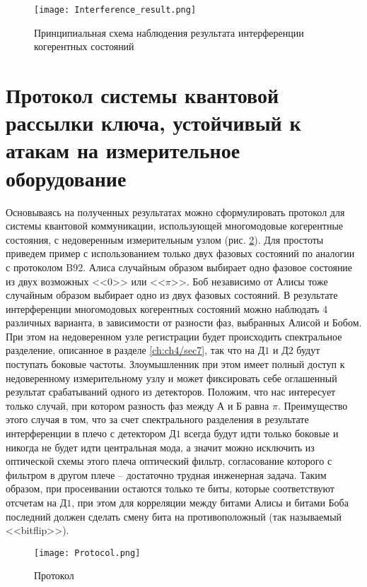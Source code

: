 \begin{figure}[ht]
 \centering
  \texttt{[image: Interference\_result.png]}
  \caption{Принципиальная схема наблюдения результата интерференции когерентных состояний}
  \label{fig:Interference_result}
\end{figure}

\pagebreak

\section{Протокол системы квантовой рассылки ключа, устойчивый к атакам на измерительное оборудование} \label{ch:ch4/sec8}

Основываясь на полученных результатах можно сформулировать протокол для системы квантовой коммуникации, использующей многомодовые когерентные состояния, с недоверенным измерительным узлом (рис. \ref{fig:Protocol}). Для простоты приведем пример с использованием только двух фазовых состояний по аналогии с протоколом B92. Алиса случайным образом выбирает одно фазовое состояние из двух возможных <<$0$>> или <<$\pi$>>. Боб независимо от Алисы тоже случайным образом выбирает одно из двух фазовых состояний. В результате интерференции многомодовых когерентных состояний можно наблюдать 4 различных варианта, в зависимости от разности фаз, выбранных Алисой и Бобом.  При этом на недоверенном узле регистрации будет происходить спектральное разделение, описанное в разделе \ref{ch:ch4/sec7}, так что на $Д1$ и $Д2$ будут поступать боковые частоты. Злоумышленник при этом имеет полный доступ к недоверенному измерительному узлу и может фиксировать себе оглашенный результат срабатываний одного из детекторов. Положим, что нас интересует только случай, при котором разность фаз между $А$ и $Б$ равна $\pi$. Преимущество этого случая в том, что за счет спектрального разделения в результате интерференции в плечо с детектором $Д1$ всегда будут идти только боковые и никогда не будет идти центральная мода, а значит можно исключить из оптической схемы этого плеча оптический фильтр, согласование которого с фильтром в другом плече -- достаточно трудная инженерная задача. Таким образом, при просеивании остаются только те биты, которые соответствуют отсчетам на $Д1$, при этом для корреляции между битами Алисы и битами Боба последний должен сделать смену бита на противоположный (так называемый <<bitflip>>).  

\begin{figure}[ht]
 \centering
  \texttt{[image: Protocol.png]}
  \caption{Протокол}
  \label{fig:Protocol}
\end{figure}


